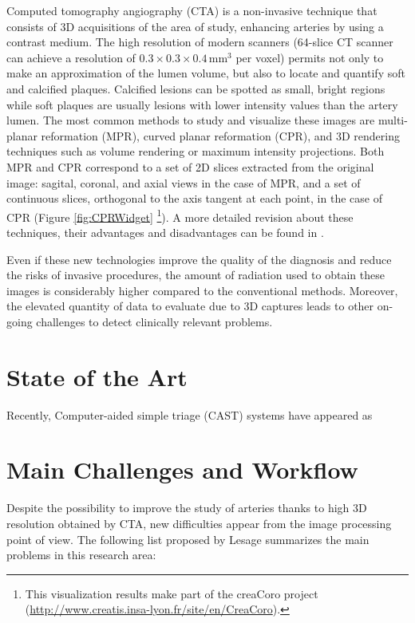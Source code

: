 Computed tomography angiography (CTA) is a non-invasive technique that consists of 3D acquisitions of the area of study, enhancing arteries by using a contrast medium. The high resolution of modern scanners (64-slice CT scanner can achieve a resolution of $0.3 \times 0.3 \times 0.4${\,}mm$^3$ per voxel) permits not only to make an approximation of the lumen volume, but also to locate and quantify soft and calcified plaques. Calcified lesions can be spotted as small, bright regions while soft plaques are usually lesions with lower intensity values than the artery lumen. The most common methods to study and visualize these images are multi-planar reformation (MPR), curved planar reformation (CPR), and 3D rendering techniques such as volume rendering or maximum intensity projections. Both MPR and CPR correspond to a set of 2D slices extracted from the original image: sagital, coronal, and axial views in the case of MPR, and a set of continuous slices, orthogonal to the axis tangent at each point, in the case of CPR (Figure \ref{fig:CPRWidget} \footnote{This visualization results make part of the creaCoro project (\href{http://www.creatis.insa-lyon.fr/site/en/CreaCoro}{http://www.creatis.insa-lyon.fr/site/en/CreaCoro}).}). A more detailed revision about these techniques, their advantages and disadvantages can be found in \citep{Wang2011Thesis}.

Even if these new technologies improve the quality of the diagnosis and reduce the risks of invasive procedures, the amount of radiation used to obtain these images is considerably higher compared to the conventional methods. Moreover, the elevated quantity of data to evaluate due to 3D captures leads to other on-going challenges to detect clinically relevant problems.

\section{State of the Art}

Recently, Computer-aided simple triage (CAST) systems have appeared as 


\section{Main Challenges and Workflow}
%
Despite the possibility to improve the study of arteries thanks to high 3D resolution obtained by CTA, new difficulties appear from the image processing point of view. The following list proposed by Lesage \citep{Lesage2009Thesis} summarizes the main problems in this research area:

